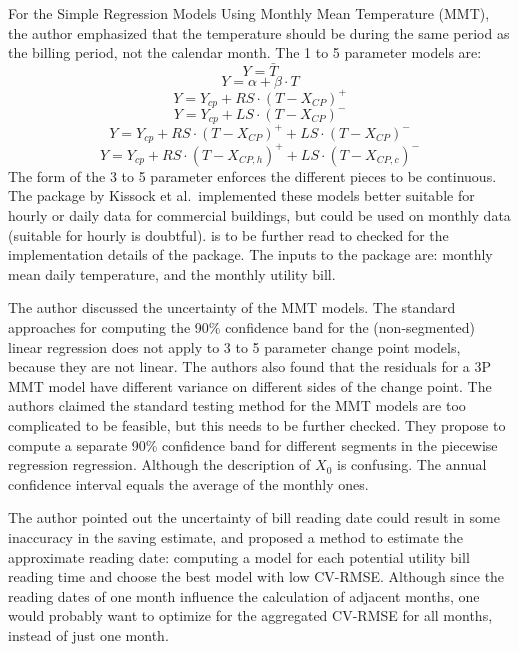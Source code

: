 \documentclass[12pt]{article}
\begin{document}
For the Simple Regression Models Using Monthly Mean Temperature (MMT),
the author emphasized that the temperature should be during the same
period as the billing period, not the calendar month. The 1 to 5
parameter models are:
\begin{equation}
  \label{eq:p1}
    Y = \bar{T}
\end{equation}
\begin{equation}
  \label{eq:p2}
    Y = \alpha + \beta \cdot T
\end{equation}
\begin{equation}
  \label{eq:p3a}
    Y = Y_{cp} + RS \cdot (T - X_{CP})^+
\end{equation}
\begin{equation}
  \label{eq:p3b}
    Y = Y_{cp} + LS \cdot (T - X_{CP})^-
\end{equation}
\begin{equation}
  \label{eq:p4}
    Y = Y_{cp} + RS \cdot (T - X_{CP})^+ + LS \cdot (T - X_{CP})^-
\end{equation}
\begin{equation}
  \label{eq:p5}
    Y = Y_{cp} + RS \cdot (T - X_{CP, h})^+ + LS \cdot (T - X_{CP, c})^-
\end{equation}
The form of the 3 to 5 parameter enforces the different pieces to be
continuous. The package by Kissock et al.\ implemented these models
better suitable for hourly or daily data for commercial buildings, but
could be used on monthly data (suitable for hourly is
doubtful). \cite{haberl1994bin} is to be further read to checked for
the implementation details of the package. The inputs to the package
are: monthly mean daily temperature, and the monthly utility bill.

The author discussed the uncertainty of the MMT models. The standard
approaches for computing the 90\% confidence band for the
(non-segmented) linear regression does not apply to 3 to 5 parameter
change point models, because they are not linear. The authors also
found that the residuals for a 3P MMT model have different variance on
different sides of the change point. The authors claimed the standard
testing method for the MMT models are too complicated to be feasible,
but this needs to be further checked. They propose to compute a
separate 90\% confidence band for different segments in the piecewise
regression regression. Although the description of $X_0$ is
confusing. The annual confidence interval equals the average of the
monthly ones.

The author pointed out the uncertainty of bill reading date could
result in some inaccuracy in the saving estimate, and proposed a
method to estimate the approximate reading date: computing a model for
each potential utility bill reading time and choose the best model
with low CV-RMSE. Although since the reading dates of one month
influence the calculation of adjacent months, one would probably want
to optimize for the aggregated CV-RMSE for all months, instead of just
one month.
\end{document}
